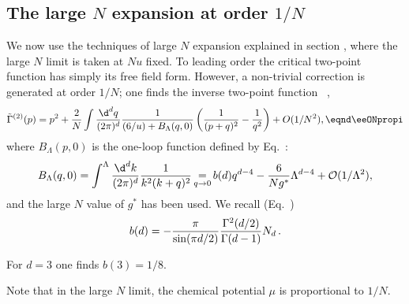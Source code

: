 \subsection{The large $N$ expansion at order $1/N$}

We now use the techniques of large $N$ expansion explained in section \scfivN, where the large $N$ limit is taken
at $Nu$ fixed.  To leading order the critical two-point function has simply
its free field form.  However, a non-trivial correction is generated at order
$1/N$; one finds the inverse two-point function \eONpropi\ ,
$$\tilde
\Gamma^{(2)}(p)= p^2 +{2\over N }\int
 \lfrac{\d^{d}q}{(2\pi)^{d}}{1 \over(6/u)+B_\Lambda (q,0)}\left({1 \over
(p+q)^2} -{1 \over q^2}\right) + O(1/ N^2),
\eqnd\eeONpropi
$$
where $B_\Lambda(p,0) $ is the one-loop function defined by Eq.~\ebullecrit:
$$
B_\Lambda (q,0)=\int^\Lambda  \lfrac{\d^{d}k}{(2\pi)^{d}}\lfrac{1}{k^2(k+q)^2}\mathop{=}_{q\to0}b(d)q^{d-4} -{6\over N g^*}\Lambda^{d-4}
+{\cal O}(1/\Lambda^2),
$$
and the large $N$ value of $g^*$ has been used. We recall (Eq.~\econstb)
$$
b(d)=-{\pi
\over\sin(\pi d/2)}  {\Gamma^2 (d/ 2) \over \Gamma (d-1)} N_d\,.
 $$

For $d=3$ one finds $b(3)=1/ 8$.\par
Note that in the large $N$ limit, the chemical potential $\mu$ is
proportional to $1/N$.

